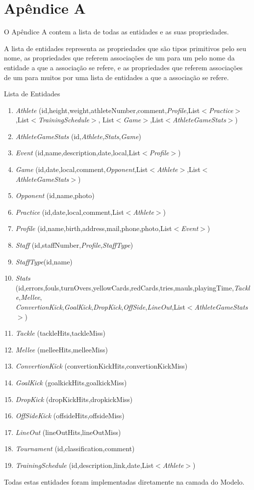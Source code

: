 %
%
%
\chapter{Apêndice A} \label{ap:exemplo}
O Apêndice A contem a lista de todas as entidades e as suas propriedades. 

A lista de entidades representa as propriedades que são tipos primitivos pelo seu nome, as propriedades que referem associações de um para um pelo nome da entidade a que a associação se refere, e as propriedades que referem associações de um para muitos por uma lista de entidades a que a associação se refere.


Lista de Entidades
\begin{enumerate}
	\item \emph{Athlete}	(id,height,weight,athleteNumber,comment,\emph{Profile},List$<$\emph{Practice}$>$,List$<$\emph{TrainingSchedule}$>$,
	List$<$\emph{Game}$>$,List$<$\emph{AthleteGameStats}$>$)
	\item \emph{AthleteGameStats} (id,\emph{Athlete},\emph{Stats},\emph{Game})
	\item \emph{Event} (id,name,description,date,local,List$<$\emph{Profile}$>$)
	\item \emph{Game} (id,date,local,comment,\emph{Opponent},List$<$\emph{Athlete}$>$,List$<$\emph{AthleteGameStats}$>$)
	\item \emph{Opponent}
	(id,name,photo)
	\item \emph{Practice} (id,date,local,comment,List$<$\emph{Athlete}$>$)
	\item \emph{Profile} (id,name,birth,address,mail,phone,photo,List$<$\emph{Event}$>$)
	\item \emph{Staff} (id,staffNumber,\emph{Profile},\emph{StaffType})
	\item \emph{StaffType}(id,name)
	\item \emph{Stats} (id,errors,fouls,turnOvers,yellowCards,redCards,tries,mauls,playingTime,\emph{Tackle},\emph{Mellee},\\
	\emph{ConvertionKick},\emph{GoalKick},\emph{DropKick},\emph{OffSide},\emph{LineOut},List$<$\emph{AthleteGameStats}$>$)
	\item \emph{Tackle} (tackleHits,tackleMiss)
	\item \emph{Mellee} (melleeHits,melleeMiss)
	\item \emph{ConvertionKick} (convertionKickHits,convertionKickMiss)
	\item \emph{GoalKick} (goalkickHits,goalkickMiss)
	\item \emph{DropKick} (dropKickHits,dropkickMiss)
	\item \emph{OffSideKick} (offsideHits,offsideMiss)
	\item \emph{LineOut} (lineOutHits,lineOutMiss)
	\item \emph{Tournament} (id,classification,comment)
	\item \emph{TrainingSchedule} (id,description,link,date,List$<$\emph{Athlete}$>$)
\end{enumerate}
Todas estas entidades foram implementadas diretamente na camada do Modelo.
\newpage